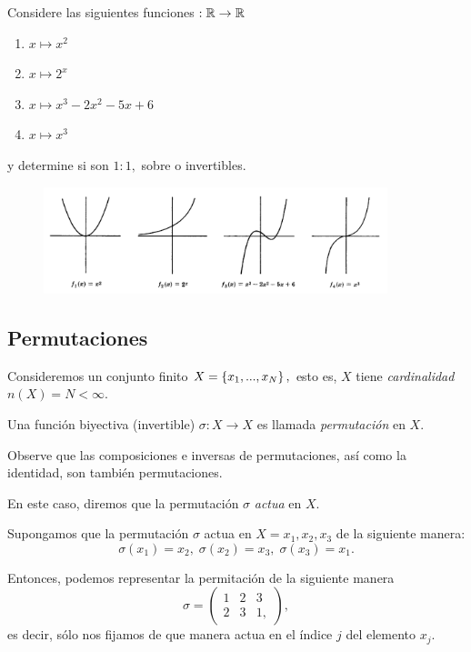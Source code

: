 \begin{problema}
Considere las siguientes funciones $:\mathbb{R} \to \mathbb{R}$
\begin{enumerate}
\item $x \mapsto x^{2}$
\item $x \mapsto 2^{x}$
\item $x \mapsto x^{3}-2x^{2}-5x+6$
\item $x \mapsto x^{3}$
\end{enumerate}
y determine si son $1:1,$ sobre o invertibles.
\end{problema}




\begin{figure}[h!]
\centering
\includegraphics[width=10cm]{./md/MD02_IM02.png}
\label{fig:MD0202}
\end{figure}



\subsection{Permutaciones}


Consideremos un conjunto finito $X=\left\{ x_{1},...,x_{N} \right\},$ esto es, $X$ tiene \emph{cardinalidad} $n(X)=N < \infty.$


Una función biyectiva (invertible) $\sigma:X \to X$ es llamada \emph{permutación} en $X.$


Observe que las composiciones e inversas de permutaciones, así como la identidad, son tambi\'en permutaciones.


En este caso, diremos que la permutación $\sigma$ \emph{actua} en $X.$



Supongamos que la permutación $\sigma$ actua en $X={x_{1},x_{2},x_{3}}$ de la siguiente manera:
$$
\sigma(x_{1})=x_{2}, \; \sigma(x_{2})=x_{3}, \; \sigma(x_{3})=x_{1}.
$$

Entonces, podemos representar la permitación de la siguiente manera
$$\sigma=
\begin{pmatrix}
1 & 2 & 3 \\
2 & 3 & 1,
\end{pmatrix},
$$  es decir, sólo nos fijamos de que manera actua en el índice $j$ del elemento $x_{j}.$



